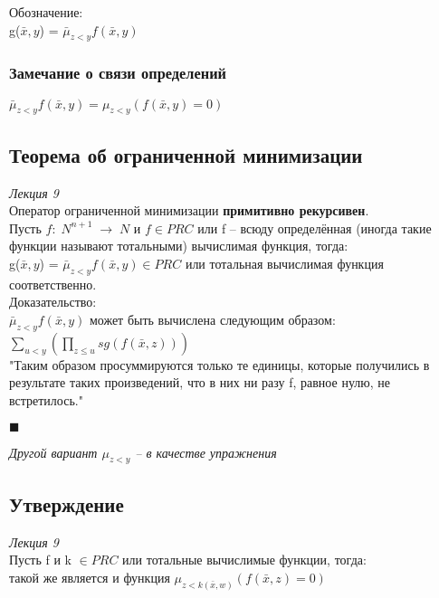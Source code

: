             Обозначение:\\
            g($\bar x, y$) = $\bar \mu_{z < y} f(\bar x, y)$\\
            
        \subsubsection{Замечание о связи определений}
        $\bar \mu_{z < y} f(\bar x, y) = \mu_{z < y} (f(\bar x, y) = 0)$
    
    \subsection{Теорема об ограниченной минимизации}
    \emph{Лекция 9}\\
        
        Оператор ограниченной минимизации \textbf{примитивно рекурсивен}.\\
        
        Пусть $f:\; N^{n+1}\; \rightarrow\; N$ и $f \in PRC$ или f -- всюду определённая (иногда такие функции называют тотальными) вычислимая функция, тогда:\\
        
        g($\bar x, y$) = $\bar \mu_{z < y} f(\bar x, y) \in PRC$ или тотальная вычислимая функция соответственно.\\
        
        Доказательство:\\
        $\bar \mu_{z < y} f(\bar x, y)$ может быть вычислена следующим образом:\\
        
        $\sum\limits_{u < y}(\prod\limits_{z \leq u}sg(f(\bar x , z)))$\\
        "Таким образом просуммируются только те единицы, которые получились в результате таких произведений, что в них ни разу f, равное нулю, не встретилось."
        \begin{flushright}
            $\blacksquare$\\
        \end{flushright}
        
        \emph{Другой вариант $\mu_{z < y}$ -- в качестве упражнения}
    
    \subsection{Утверждение}
    \emph{Лекция 9}\\
        Пусть f и k $\in PRC$ или тотальные вычислимые функции, тогда:\\
        такой же является и функция $\mu_{z < k(\bar x, w)}(f(\bar x, z) = 0)$
        
